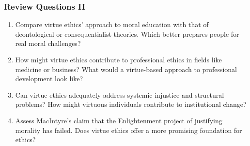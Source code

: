 \documentclass{beamer}
\begin{document}
\begin{frame}
    \frametitle{Review Questions II}
    \begin{enumerate}
        \item Compare virtue ethics' approach to moral education with that of deontological or consequentialist theories. Which better prepares people for real moral challenges?
        
        \item How might virtue ethics contribute to professional ethics in fields like medicine or business? What would a virtue-based approach to professional development look like?
        
        \item Can virtue ethics adequately address systemic injustice and structural problems? How might virtuous individuals contribute to institutional change?
        
        \item Assess MacIntyre's claim that the Enlightenment project of justifying morality has failed. Does virtue ethics offer a more promising foundation for ethics?
    \end{enumerate}
\end{frame}
\end{document}
